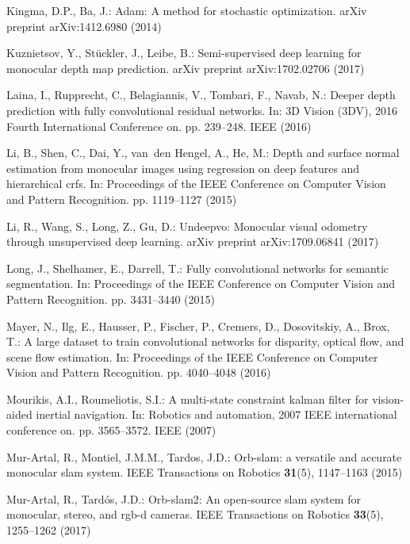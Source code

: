 \documentclass[runningheads]{llncs}
\begin{document}
\begin{thebibliography}{10}
Kingma, D.P., Ba, J.: Adam: A method for stochastic optimization. arXiv
  preprint arXiv:1412.6980  (2014)

Kuznietsov, Y., St{\"u}ckler, J., Leibe, B.: Semi-supervised deep learning for
  monocular depth map prediction. arXiv preprint arXiv:1702.02706  (2017)

Laina, I., Rupprecht, C., Belagiannis, V., Tombari, F., Navab, N.: Deeper depth
  prediction with fully convolutional residual networks. In: 3D Vision (3DV),
  2016 Fourth International Conference on. pp. 239--248. IEEE (2016)

Li, B., Shen, C., Dai, Y., van~den Hengel, A., He, M.: Depth and surface normal
  estimation from monocular images using regression on deep features and
  hierarchical crfs. In: Proceedings of the IEEE Conference on Computer Vision
  and Pattern Recognition. pp. 1119--1127 (2015)

Li, R., Wang, S., Long, Z., Gu, D.: Undeepvo: Monocular visual odometry through
  unsupervised deep learning. arXiv preprint arXiv:1709.06841  (2017)

Long, J., Shelhamer, E., Darrell, T.: Fully convolutional networks for semantic
  segmentation. In: Proceedings of the IEEE Conference on Computer Vision and
  Pattern Recognition. pp. 3431--3440 (2015)

Mayer, N., Ilg, E., Hausser, P., Fischer, P., Cremers, D., Dosovitskiy, A.,
  Brox, T.: A large dataset to train convolutional networks for disparity,
  optical flow, and scene flow estimation. In: Proceedings of the IEEE
  Conference on Computer Vision and Pattern Recognition. pp. 4040--4048 (2016)

Mourikis, A.I., Roumeliotis, S.I.: A multi-state constraint kalman filter for
  vision-aided inertial navigation. In: Robotics and automation, 2007 IEEE
  international conference on. pp. 3565--3572. IEEE (2007)

Mur-Artal, R., Montiel, J.M.M., Tardos, J.D.: Orb-slam: a versatile and
  accurate monocular slam system. IEEE Transactions on Robotics
  \textbf{31}(5),  1147--1163 (2015)

Mur-Artal, R., Tard{\'o}s, J.D.: Orb-slam2: An open-source slam system for
  monocular, stereo, and rgb-d cameras. IEEE Transactions on Robotics
  \textbf{33}(5),  1255--1262 (2017)


\end{thebibliography}
\end{document}
